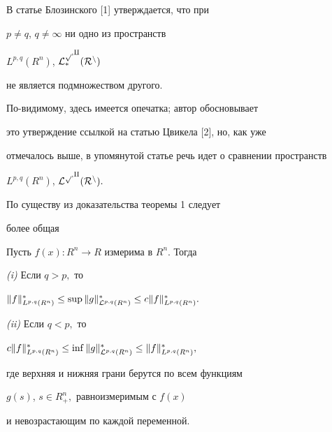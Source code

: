 \begin{note} 


В статье Блозинского [1] утверждается, что при


$p \ne q$, $q \ne \infty$ ни одно из пространств


$L^{p,q}(R^n)$, $\cal L_*^{p,q}(R^n)$


не является подмножеством другого.


По-видимому, здесь имеется опечатка; автор обосновывает


это утверждение ссылкой на статью Цвикела [2], но, как уже


отмечалось выше, в упомянутой статье речь идет о сравнении пространств


$L^{p,q}(R^n)$, $\cal L^{p,q}(R^n).$


\end{note}





\begin{note} 


По существу из доказательства теоремы 1 следует


более общая


\end{note}





\begin{thm}


Пусть $f(x): R^n \to R$ измерима в $R^n$. Тогда





{\em (i)} Если $q>p,$ то


$ \|f\|_{L^{p,q}(R^n)}^* \le


\sup \|g\|_{{\cal L}^{p,q}(R^n)}^* \le


c \|f\|_{L^{p,q}(R^n)}^*.$





{\em (ii)} Если $q<p,$ то


$c \|f\|_{L^{p,q}(R^n)}^* \le


\inf \|g\|_{{\cal L}^{p,q}(R^n)}^* \le


\|f\|_{L^{p,q}(R^n)}^*,$


где верхняя и нижняя грани берутся по всем функциям


$g(s)$, $s\in R_+^n,$ равноизмеримым с $f(x)$


и невозрастающим по каждой переменной.


\end{thm}





